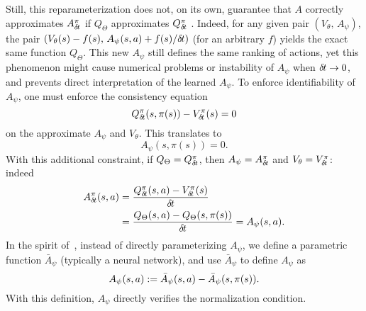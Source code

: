 Still, this reparameterization does not, on its own, guarantee that $A$
correctly approximates $A^\pi_{\delta\hspace{-.1em}t}$ if
$Q_\Theta$ approximates $Q^\pi_{\delta\hspace{-.1em}t}$%
.
Indeed, for any given pair $(V_\theta,\,A_\psi)$, the pair $(V_\theta(s) -
f(s),\,A_\psi(s,a)+f(s)/{\delta\hspace{-.1em}t})$ (for an arbitrary $f$)
yields the exact same function $Q_\Theta$. This new $A_\psi$ still defines %
the same ranking of actions, yet this phenomenon might cause
numerical problems or instability of $A_\psi$ when ${\delta\hspace{-.1em}t}\to 0$, and prevents direct
interpretation of the learned $A_\psi$.
To enforce identifiability of $A_\psi$, one must enforce the consistency equation
\begin{equation}
	Q^\pi_{\delta\hspace{-.1em}t}(s, \pi(s)) - V^\pi_{\delta\hspace{-.1em}t}(s) = 0
\end{equation}
on the approximate $A_\psi$ and $V_\theta$. This translates to
\begin{equation}
	A_\psi(s, \pi(s)) = 0.
\end{equation}
With this additional constraint, if $Q_\Theta = Q^\pi_{\delta\hspace{-.1em}t}$, then $A_\psi =
A^\pi_{\delta\hspace{-.1em}t}$ and $V_\theta = V^\pi_{\delta\hspace{-.1em}t}$: indeed
\begin{align}
	A^\pi_{\delta\hspace{-.1em}t}(s, a) &= \frac{Q^\pi_{\delta\hspace{-.1em}t}(s,a) - V^\pi_{\delta\hspace{-.1em}t}(s)}{{\delta\hspace{-.1em}t}}\\
		    &= \frac{Q_\Theta(s,a) - Q_\Theta(s, \pi(s))}{{\delta\hspace{-.1em}t}}
		    = A_\psi(s, a).
\end{align}
In the spirit of~\cite{dueling_nets}, instead of directly parameterizing $A_\psi$,
we define a parametric function $\bar{A}_\psi$ (typically a neural network),
and use $\bar{A}_\psi$ to define $A_\psi$ as
\begin{equation}
\label{eq:Aparam}
	A_\psi(s, a) \mathrel{\mathop{:}}= \bar{A}_\psi(s, a) - \bar{A}_\psi(s, \pi(s)).
\end{equation}
With this definition, $A_\psi$ directly verifies the normalization condition.

